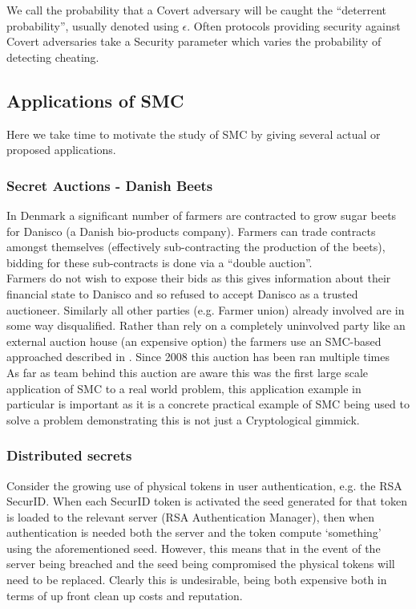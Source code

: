 \documentclass[a4paper,11pt]{article}
\begin{document}
				We call the probability that a Covert adversary will be caught the ``deterrent probability'', usually denoted using $\epsilon$. Often protocols providing security against Covert adversaries take a Security parameter which varies the probability of detecting cheating.


		\subsection{Applications of SMC} \label{sub:Applications}
			Here we take time to motivate the study of SMC by giving several actual or proposed applications.

			\subsubsection{Secret Auctions - Danish Beets} \label{BeetsAuctionApplication}
				In Denmark a significant number of farmers are contracted to grow sugar beets for Danisco (a Danish bio-products company). Farmers can trade contracts amongst themselves (effectively sub-contracting the production of the beets), bidding for these sub-contracts is done via a ``double auction''.\\

				Farmers do not wish to expose their bids as this gives information about their financial state to Danisco and so refused to accept Danisco as a trusted auctioneer. Similarly all other parties (e.g. Farmer union) already involved are in some way disqualified. Rather than rely on a completely uninvolved party like an external auction house (an expensive option) the farmers use an SMC-based approached described in \cite{SugarBeets}. Since 2008 this auction has been ran multiple times \\

				As far as team behind this auction are aware this was the first large scale application of SMC to a real world problem, this application example in particular is important as it is a concrete practical example of SMC being used to solve a problem demonstrating this is not just a Cryptological gimmick.

			\subsubsection{Distributed secrets} \label{sub2:DistributedSecretApplication}
				Consider the growing use of physical tokens in user authentication, e.g. the RSA SecurID. When each SecurID token is activated the seed generated for that token is loaded to the relevant server (RSA Authentication Manager), then when authentication is needed both the server and the token compute `something' using the aforementioned seed. However, this means that in the event of the server being breached and the seed being compromised the physical tokens will need to be replaced. Clearly this is undesirable, being both expensive both in terms of up front clean up costs and reputation.\\
\end{document}
